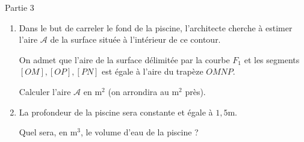 \begin{h3}Partie 3\end{h3}
\begin{enumerate}
     \item
     Dans le but de carreler le fond de la piscine, l'architecte cherche à estimer l'aire $\mathscr A$  de la surface située à l'intérieur de ce contour.
     \par
     On admet que l'aire de la surface délimitée par  la courbe $F_1$ et les segments $[OM], [OP], [PN]$ est égale à l'aire du trapèze $OMNP$.
     \par
     Calculer l'aire $\mathscr A$ en $\text{m}^2$ (on arrondira au $\text{m}^2$ près).
     \item
     La profondeur de la piscine sera constante et égale à $1,5\text{m}$.
     \par
     Quel sera, en $\text{m}^3$, le volume d'eau de la piscine ?
\end{enumerate}

